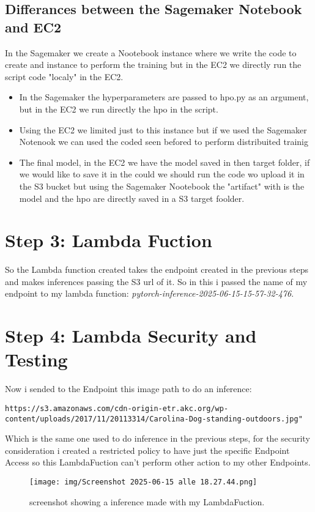 \documentclass[12pt,a4paper]{article}
\begin{document}
\subsection{Differances between the Sagemaker Notebook and EC2}
In the Sagemaker we create a Nootebook instance where we write the code to create and instance to perform the training but in the EC2 we directly run the script code "localy" in the EC2.
\begin{itemize}
  \item In the Sagemaker the hyperparameters are passed to hpo.py as an argument, but in the EC2 we run directly the hpo in the script.
  \item Using the EC2 we limited just to this instance but if we used the Sagemaker Notenook we can used the coded seen befored to perform distribuited trainig
  \item The final model, in the EC2 we have the model saved in then target folder, if we would like to save it in the could we should run the code wo upload it in the S3 bucket but using the Sagemaker Nootebook the "artifact" with is the model and the hpo are directly saved in a S3 target foolder.
\end{itemize}

\section{Step 3: Lambda Fuction}
So the Lambda function created takes the endpoint created in the previous steps and makes inferences passing the S3 url of it. So in this i passed the name of my endpoint to my lambda function: \textit{ pytorch-inference-2025-06-15-15-57-32-476}. 

\section{Step 4: Lambda Security and Testing}

Now i sended to the Endpoint this image path to do an inference: 
\begin{verbatim}https://s3.amazonaws.com/cdn-origin-etr.akc.org/wp-content/uploads/2017/11/20113314/Carolina-Dog-standing-outdoors.jpg"\end{verbatim}
Which is the same one used to do inference in the previous steps, for the security consideration i created a restricted policy to have just the specific Endpoint Access so this LambdaFuction can't perform other action to my other Endpoints.

\begin{figure}[htbp]
  \centering
  \texttt{[image: img/Screenshot 2025-06-15 alle 18.27.44.png]}
  \caption{screenshot showing a inference made with my LambdaFuction.}
  \label{fig:example}
\end{figure}
\end{document}
